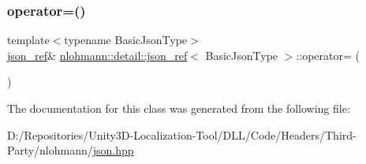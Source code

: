 \mbox{\label{classnlohmann_1_1detail_1_1json__ref_a9a73363d9be6b300ddd30745786c50a6}} 
\subsubsection{\texorpdfstring{operator=()}{operator=()}\hspace{0.1cm}{\footnotesize\ttfamily [2/2]}}
{\footnotesize\ttfamily template$<$typename Basic\+Json\+Type$>$ \\
\mbox{\hyperlink{classnlohmann_1_1detail_1_1json__ref}{json\+\_\+ref}}\& \mbox{\hyperlink{classnlohmann_1_1detail_1_1json__ref}{nlohmann\+::detail\+::json\+\_\+ref}}$<$ Basic\+Json\+Type $>$\+::operator= (\begin{DoxyParamCaption}\item[{\mbox{\hyperlink{classnlohmann_1_1detail_1_1json__ref}{json\+\_\+ref}}$<$ Basic\+Json\+Type $>$ \&\&}]{ }\end{DoxyParamCaption})\hspace{0.3cm}{\ttfamily [delete]}}



The documentation for this class was generated from the following file\+:\begin{DoxyCompactItemize}
\item 
D\+:/\+Repositories/\+Unity3\+D-\/\+Localization-\/\+Tool/\+D\+L\+L/\+Code/\+Headers/\+Third-\/\+Party/nlohmann/\mbox{\hyperlink{json_8hpp}{json.\+hpp}}\end{DoxyCompactItemize}
